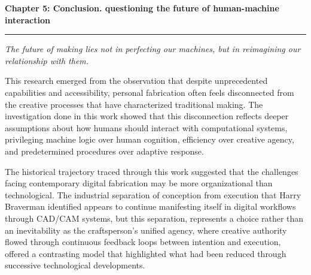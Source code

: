 \clearpage

\setcounter{chapter}{5}
\setcounter{section}{0}


\pagestyle{fancy}
\fancyhf{} 
\fancyfoot[C]{\thepage} 
\renewcommand{\headrulewidth}{0pt}
\renewcommand{\footrulewidth}{0pt}

\noindent
{\Large\textbf{Chapter 5: Conclusion. questioning the future of human-machine interaction}}
\vspace{0.3cm}
\hrule
\vspace{0.8cm}
\label{ch:conclusions}

\setlength{\parindent}{0pt}

\textit{The future of making lies not in perfecting our machines, but in reimagining our relationship with them.}

\vspace{0.5cm}

This research emerged from the observation that despite unprecedented capabilities and accessibility, personal fabrication often feels disconnected from the creative processes that have characterized traditional making. The investigation done in this work showed that this disconnection reflects deeper assumptions about how humans should interact with computational systems, privileging machine logic over human cognition, efficiency over creative agency, and predetermined procedures over adaptive response.

\vspace{0.5cm}

The historical trajectory traced through this work suggested that the challenges facing contemporary digital fabrication may be more organizational than technological. The industrial separation of conception from execution that Harry Braverman identified appears to continue manifesting itself in digital workflows through CAD/CAM systems, but this separation, represents a choice rather than an inevitability as the craftsperson's unified agency, where creative authority flowed through continuous feedback loops between intention and execution, offered a contrasting model that highlighted what had been reduced through successive technological developments.

\vspace{0.5cm}

